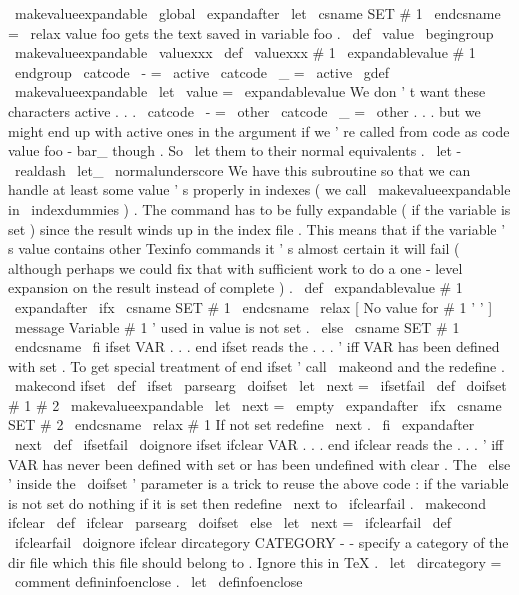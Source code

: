 {{{%
\
makevalueexpandable
\
global
\
expandafter
\
let
\
csname
SET
#
1
\
endcsname
=
\
relax
}
%
}
%
value
{
foo
}
gets
the
text
saved
in
variable
foo
.
\
def
\
value
{
\
begingroup
\
makevalueexpandable
\
valuexxx
}
\
def
\
valuexxx
#
1
{
\
expandablevalue
{
#
1
}
\
endgroup
}
{
\
catcode
\
-
=
\
active
\
catcode
\
_
=
\
active
%
\
gdef
\
makevalueexpandable
{
%
\
let
\
value
=
\
expandablevalue
%
We
don
'
t
want
these
characters
active
.
.
.
\
catcode
\
-
=
\
other
\
catcode
\
_
=
\
other
%
.
.
.
but
we
might
end
up
with
active
ones
in
the
argument
if
%
we
'
re
called
from
code
as
code
{
value
{
foo
-
bar_
}
}
though
.
%
So
\
let
them
to
their
normal
equivalents
.
\
let
-
\
realdash
\
let_
\
normalunderscore
}
}
%
We
have
this
subroutine
so
that
we
can
handle
at
least
some
value
'
s
%
properly
in
indexes
(
we
call
\
makevalueexpandable
in
\
indexdummies
)
.
%
The
command
has
to
be
fully
expandable
(
if
the
variable
is
set
)
since
%
the
result
winds
up
in
the
index
file
.
This
means
that
if
the
%
variable
'
s
value
contains
other
Texinfo
commands
it
'
s
almost
certain
%
it
will
fail
(
although
perhaps
we
could
fix
that
with
sufficient
work
%
to
do
a
one
-
level
expansion
on
the
result
instead
of
complete
)
.
%
\
def
\
expandablevalue
#
1
{
%
\
expandafter
\
ifx
\
csname
SET
#
1
\
endcsname
\
relax
{
[
No
value
for
#
1
'
'
]
}
%
\
message
{
Variable
#
1
'
used
in
value
is
not
set
.
}
%
\
else
\
csname
SET
#
1
\
endcsname
\
fi
}
%
ifset
VAR
.
.
.
end
ifset
reads
the
.
.
.
'
iff
VAR
has
been
defined
%
with
set
.
%
%
To
get
special
treatment
of
end
ifset
'
call
\
makeond
and
the
redefine
.
%
\
makecond
{
ifset
}
\
def
\
ifset
{
\
parsearg
{
\
doifset
{
\
let
\
next
=
\
ifsetfail
}
}
}
\
def
\
doifset
#
1
#
2
{
%
{
%
\
makevalueexpandable
\
let
\
next
=
\
empty
\
expandafter
\
ifx
\
csname
SET
#
2
\
endcsname
\
relax
#
1
%
If
not
set
redefine
\
next
.
\
fi
\
expandafter
}
\
next
}
\
def
\
ifsetfail
{
\
doignore
{
ifset
}
}
%
ifclear
VAR
.
.
.
end
ifclear
reads
the
.
.
.
'
iff
VAR
has
never
been
%
defined
with
set
or
has
been
undefined
with
clear
.
%
%
The
\
else
'
inside
the
\
doifset
'
parameter
is
a
trick
to
reuse
the
%
above
code
:
if
the
variable
is
not
set
do
nothing
if
it
is
set
%
then
redefine
\
next
to
\
ifclearfail
.
%
\
makecond
{
ifclear
}
\
def
\
ifclear
{
\
parsearg
{
\
doifset
{
\
else
\
let
\
next
=
\
ifclearfail
}
}
}
\
def
\
ifclearfail
{
\
doignore
{
ifclear
}
}
%
dircategory
CATEGORY
-
-
specify
a
category
of
the
dir
file
%
which
this
file
should
belong
to
.
Ignore
this
in
TeX
.
\
let
\
dircategory
=
\
comment
%
defininfoenclose
.
\
let
\
definfoenclose
}
